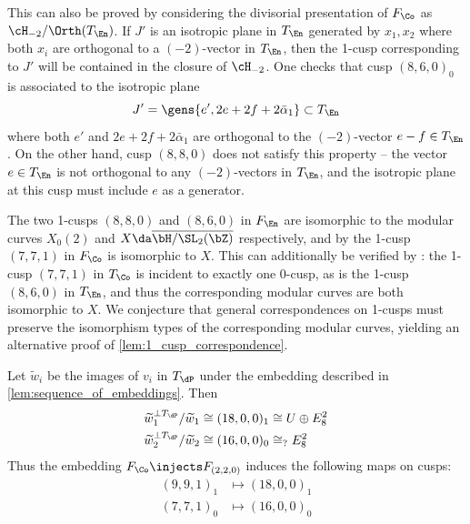 \documentclass[../main.tex]{subfiles}
\begin{document}
\begin{remark}
This can also be proved by considering the divisorial presentation of $F_{\Co}$ as $\cH_{-2}/\Orth(T_\En)$. If $J'$ is an isotropic plane in $T_\En$ generated by $x_1, x_2$ where both $x_i$ are orthogonal to a $(-2)$-vector in $T_\En$, then the 1-cusp corresponding to $J'$ will be contained in the closure of $\cH_{-2}$. One checks that cusp $(8, 6, 0)_0$ is associated to the isotropic plane 
$$
J' = \gens{e', 2e + 2f + 2\bar\alpha_1} \subset T_\En
$$ 
where both $e'$ and $2e + 2f + 2\bar\alpha_1$ are orthogonal to the $(-2)$-vector $e-f\in T_{\En}$. On the other hand, cusp $(8,8,0)$ does not satisfy this property -- the vector $e\in T_\En$ is not orthogonal to any $(-2)$-vectors in $T_\En$, and the isotropic plane at this cusp must include $e$ as a generator.
\end{remark}

\begin{remark}
The two 1-cusps $(8,8,0)$ and $(8,6,0)$ in $F_\En$ are isomorphic to the modular curves $X_0(2)$ and $X \da \overline{\bH / \SL_2(\bZ)}$ respectively, and by \cite[Cor. 5.9.10]{CD12} the 1-cusp $(7,7,1)$ in $F_\Co$ is isomorphic to $X$. This can additionally be verified by \cite[Prop. 5.13]{AE22}: the 1-cusp $(7,7,1)$ in $T_\Co$ is incident to exactly one 0-cusp, as is the 1-cusp $(8,6,0)$ in $T_\En$, and thus the corresponding modular curves are both isomorphic to $X$.
We conjecture that general correspondences on 1-cusps must preserve the isomorphism types of the corresponding modular curves, yielding an alternative proof of \cref{lem:1_cusp_correspondence}.
\end{remark}


\begin{lemma}\label{lem:cusp_map_dP}
Let $\tilde w_i$ be the images of $v_i$ in $T_\dP$ under the embedding described in \cref{lem:sequence_of_embeddings}. Then
\begin{align*}
    \tilde w_1^{\perp T_\dP}/\tilde w_1 &\cong (18, 0, 0)_1 \cong U \oplus E_8^2 \\
    \tilde w_2^{\perp T_\dP}/\tilde w_2 &\cong (16, 0, 0)_0 \cong_? E_8^2 \ 
\end{align*}
Thus the embedding $F_\Co \injects F_{(2,2,0)}$ induces the following maps on cusps:
\begin{align*}
    (9, 9, 1)_1 &\mapsto (18, 0, 0)_1 \\
    (7, 7, 1)_0 &\mapsto (16, 0, 0)_0
\end{align*}
\end{lemma}
\end{document}
